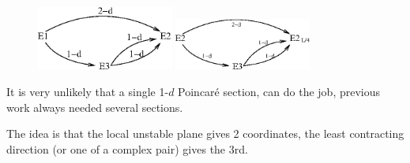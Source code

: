 \begin{figure}[t] \label{f:KS22cage}
\begin{center}
\includegraphics[width=0.4\textwidth]{figs/ks22_E1_UM_diag.eps}
\includegraphics[width=0.4\textwidth]{figs/ks22_E2_UM_diag.eps}
\end{center}
\caption{
        }
\end{figure}


It is very unlikely that a single 1-$d$ Poincar\'e section,
can do the job, previous work
always needed several sections.

The idea is that the local unstable plane gives 2 coordinates, the
least contracting direction (or one of a complex pair) gives the 3rd.

